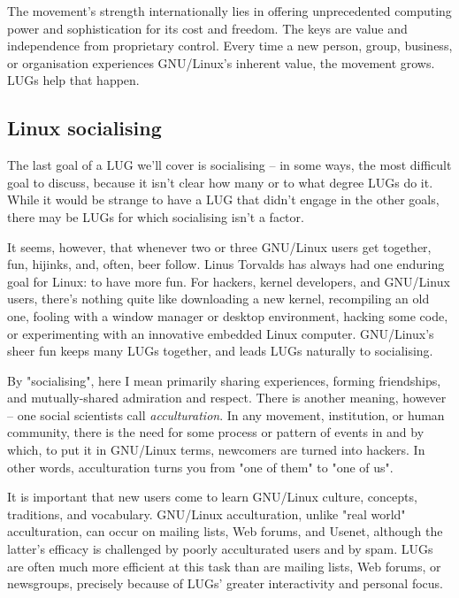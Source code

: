 The movement's strength internationally lies in offering
unprecedented computing power and sophistication for its cost and
freedom. The keys are value and independence from proprietary control.
Every time a new person, group, business, or organisation experiences
GNU/Linux's inherent value, the movement grows.  LUGs help that
happen.




\subsection{Linux socialising}

The last goal of a LUG we'll cover is socialising -- in some ways,
the most difficult goal to discuss, because it isn't clear how
many or to what degree LUGs do it. While it would be strange to
have a LUG that didn't engage in the other goals, there may be
LUGs for which socialising isn't a factor.

It seems, however, that whenever two or three GNU/Linux users get together,
fun, hijinks, and, often, beer follow. Linus Torvalds has
always had one enduring goal for Linux: to have more fun. For hackers,
kernel developers, and GNU/Linux users, there's nothing quite like
downloading a new kernel, recompiling an old one, fooling with a
window manager or desktop environment, hacking some code, or experimenting
with an innovative embedded Linux computer. GNU/Linux's sheer fun keeps many
LUGs together, and leads LUGs naturally to socialising.

By "socialising", here I mean primarily sharing experiences, forming
friendships, and mutually-shared admiration and respect. There is
another meaning, however -- one social scientists call
{\itshape acculturation\/}. In any movement, institution, or human
community, there is the need for some process or pattern of events in
and by which, to put it in GNU/Linux terms, newcomers are turned into
hackers. In other words, acculturation turns you from "one of them" to
"one of us".

It is important that new users come to learn GNU/Linux culture,
concepts, traditions, and vocabulary.  GNU/Linux acculturation, unlike "real
world" acculturation, can occur on mailing lists, Web forums, and
Usenet, although the latter's efficacy is challenged by poorly
acculturated users and by spam. LUGs are often much more efficient at
this task than are mailing lists, Web forums, or newsgroups, precisely
because of LUGs' greater interactivity and personal focus.



